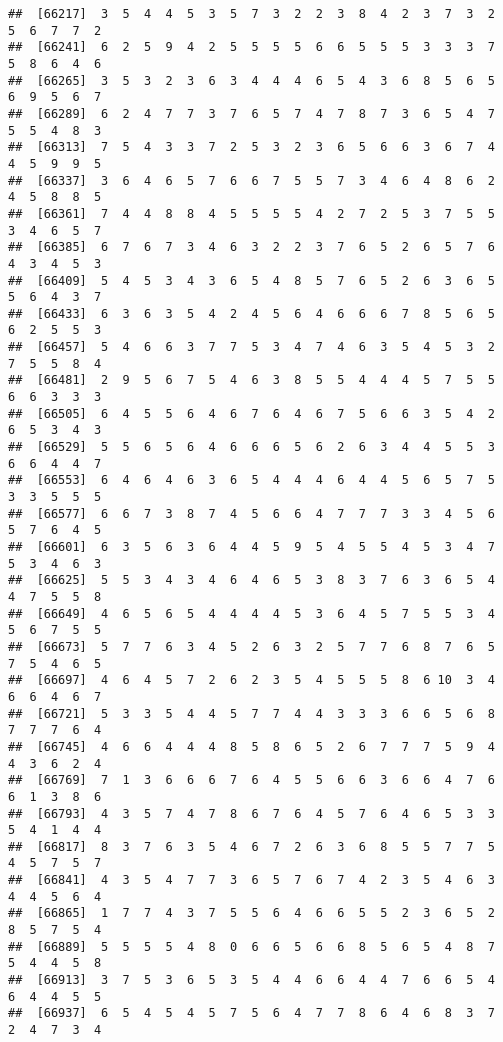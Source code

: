 \documentclass[
]{book}
\begin{document}
\begin{verbatim}
##  [66217]  3  5  4  4  5  3  5  7  3  2  2  3  8  4  2  3  7  3  2  5  6  7  7  2
##  [66241]  6  2  5  9  4  2  5  5  5  5  6  6  5  5  5  3  3  3  7  5  8  6  4  6
##  [66265]  3  5  3  2  3  6  3  4  4  4  6  5  4  3  6  8  5  6  5  6  9  5  6  7
##  [66289]  6  2  4  7  7  3  7  6  5  7  4  7  8  7  3  6  5  4  7  5  5  4  8  3
##  [66313]  7  5  4  3  3  7  2  5  3  2  3  6  5  6  6  3  6  7  4  4  5  9  9  5
##  [66337]  3  6  4  6  5  7  6  6  7  5  5  7  3  4  6  4  8  6  2  4  5  8  8  5
##  [66361]  7  4  4  8  8  4  5  5  5  5  4  2  7  2  5  3  7  5  5  3  4  6  5  7
##  [66385]  6  7  6  7  3  4  6  3  2  2  3  7  6  5  2  6  5  7  6  4  3  4  5  3
##  [66409]  5  4  5  3  4  3  6  5  4  8  5  7  6  5  2  6  3  6  5  5  6  4  3  7
##  [66433]  6  3  6  3  5  4  2  4  5  6  4  6  6  6  7  8  5  6  5  6  2  5  5  3
##  [66457]  5  4  6  6  3  7  7  5  3  4  7  4  6  3  5  4  5  3  2  7  5  5  8  4
##  [66481]  2  9  5  6  7  5  4  6  3  8  5  5  4  4  4  5  7  5  5  6  6  3  3  3
##  [66505]  6  4  5  5  6  4  6  7  6  4  6  7  5  6  6  3  5  4  2  6  5  3  4  3
##  [66529]  5  5  6  5  6  4  6  6  6  5  6  2  6  3  4  4  5  5  3  6  6  4  4  7
##  [66553]  6  4  6  4  6  3  6  5  4  4  4  6  4  4  5  6  5  7  5  3  3  5  5  5
##  [66577]  6  6  7  3  8  7  4  5  6  6  4  7  7  7  3  3  4  5  6  5  7  6  4  5
##  [66601]  6  3  5  6  3  6  4  4  5  9  5  4  5  5  4  5  3  4  7  5  3  4  6  3
##  [66625]  5  5  3  4  3  4  6  4  6  5  3  8  3  7  6  3  6  5  4  4  7  5  5  8
##  [66649]  4  6  5  6  5  4  4  4  4  5  3  6  4  5  7  5  5  3  4  5  6  7  5  5
##  [66673]  5  7  7  6  3  4  5  2  6  3  2  5  7  7  6  8  7  6  5  7  5  4  6  5
##  [66697]  4  6  4  5  7  2  6  2  3  5  4  5  5  5  8  6 10  3  4  6  6  4  6  7
##  [66721]  5  3  3  5  4  4  5  7  7  4  4  3  3  3  6  6  5  6  8  7  7  7  6  4
##  [66745]  4  6  6  4  4  4  8  5  8  6  5  2  6  7  7  7  5  9  4  4  3  6  2  4
##  [66769]  7  1  3  6  6  6  7  6  4  5  5  6  6  3  6  6  4  7  6  6  1  3  8  6
##  [66793]  4  3  5  7  4  7  8  6  7  6  4  5  7  6  4  6  5  3  3  5  4  1  4  4
##  [66817]  8  3  7  6  3  5  4  6  7  2  6  3  6  8  5  5  7  7  5  4  5  7  5  7
##  [66841]  4  3  5  4  7  7  3  6  5  7  6  7  4  2  3  5  4  6  3  4  4  5  6  4
##  [66865]  1  7  7  4  3  7  5  5  6  4  6  6  5  5  2  3  6  5  2  8  5  7  5  4
##  [66889]  5  5  5  5  4  8  0  6  6  5  6  6  8  5  6  5  4  8  7  5  4  4  5  8
##  [66913]  3  7  5  3  6  5  3  5  4  4  6  6  4  4  7  6  6  5  4  6  4  4  5  5
##  [66937]  6  5  4  5  4  5  7  5  6  4  7  7  8  6  4  6  8  3  7  2  4  7  3  4

\end{verbatim}
\end{document}
